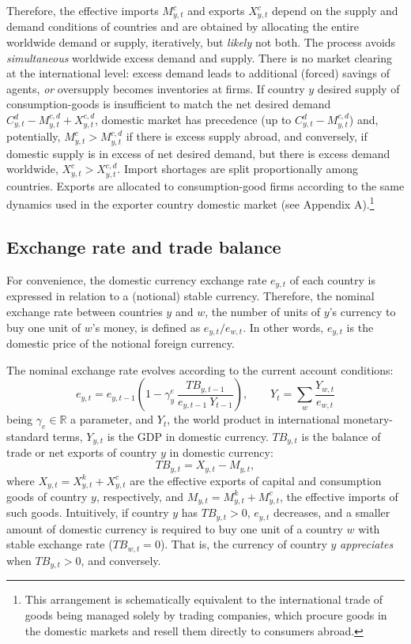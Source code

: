 \documentclass[a4paper,11pt]{article}
\begin{document}
Therefore, the effective imports $M_{y,t}^c$ and exports $X_{y,t}^c$ depend on the supply and demand conditions of countries and are obtained by allocating the entire worldwide demand or supply, iteratively, but \emph{likely} not both. The process avoids \emph{simultaneous} worldwide excess demand and supply. There is no market clearing at the international level: excess demand leads to additional (forced) savings of agents, \emph{or} oversupply becomes inventories at firms. If country $y$ desired supply of consumption-goods is insufficient to match the net desired demand $C_{y,t}^d - M_{y,t}^{c,d} + X_{y,t}^{c,d}$, domestic  market has precedence (up to $C_{y,t}^d - M_{y,t}^{c,d}$) and, potentially, $M_{y,t}^c > M_{y,t}^{c,d}$ if there is excess supply abroad, and conversely, if domestic supply is in excess of net desired demand, but there is excess demand worldwide, $X_{y,t}^c > X_{y,t}^{c,d}$. Import shortages are split proportionally among countries. Exports are allocated to consumption-good firms according to the same dynamics used in the exporter country domestic market (see Appendix A).\footnote{This arrangement is schematically equivalent to the international trade of goods being managed solely by trading companies, which procure goods in the domestic markets and resell them directly to consumers abroad.}


\subsection{Exchange rate and trade balance}

For convenience, the domestic currency exchange rate $e_{y,t}$ of each country is expressed in relation to a (notional) stable currency. Therefore, the nominal exchange rate between countries $y$ and $w$, the number of units of $y$'s currency to buy one unit of $w$'s money, is defined as $e_{y,t} / e_{w,t}$. In other words, $e_{y,t}$ is the domestic price of the notional foreign currency.

The nominal exchange rate evolves according to the current account conditions:
\begin{equation}
	e_{y,t} = e_{y,t-1} \left( 1 - \gamma_y^e ~ \dfrac{ {TB}_{y,t-1} }{ e_{y,t-1} ~ Y_{t-1} } \right), \qquad Y_t = \sum_w \dfrac{ Y_{w,t} }{ e_{w,t} }
\end{equation}
being $\gamma_e \in \mathbb{R}$ a parameter, and $Y_t$, the world product in international monetary-standard terms, $Y_{y,t}$ is the GDP in domestic currency. ${TB}_{y,t}$ is the balance of trade or net exports of country $y$ in domestic currency:
\begin{equation}
	{TB}_{y,t} = X_{y,t} - M_{y,t},
\end{equation}
where $X_{y,t} = X_{y,t}^k + X_{y,t}^c$ are the effective exports of capital and consumption goods of country $y$, respectively, and $M_{y,t} = M_{y,t}^k + M_{y,t}^c$, the effective imports of such goods. Intuitively, if country $y$ has ${TB}_{y,t} > 0$, $e_{y,t}$ decreases, and a smaller amount of domestic currency is required to buy one unit of a country $w$ with stable exchange rate (${TB}_{w,t} = 0$). That is, the currency of country $y$ \emph{appreciates} when ${TB}_{y,t} > 0$, and conversely.
\end{document}
